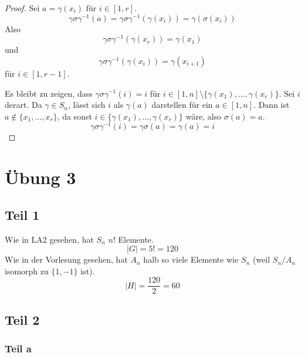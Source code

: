 \documentclass[10pt,a4paper]{article}
\begin{document}
\begin{proof}
  Sei $a = \gamma(x_{i})$ für $i \in [1, r]$.
  \begin{equation}
    \gamma\sigma\gamma^{-1}(a) = \gamma\sigma\gamma^{-1}(\gamma(x_{i})) = \gamma(\sigma(x_{i}))
  \end{equation}
  Also
  \begin{equation}
    \gamma\sigma\gamma^{-1}(\gamma(x_{r})) = \gamma(x_{1})
  \end{equation}
  und
  \begin{equation}
    \gamma\sigma\gamma^{-1}(\gamma(x_{i})) = \gamma(x_{i + 1})
  \end{equation}
  für $i \in [1, r - 1]$.

  Es bleibt zu zeigen, dass $\gamma\sigma\gamma^{-1}(i) = i$ für $i \in [1, n] \setminus \{\gamma(x_{1}), \dots, \gamma(x_{r})\}$.
  Sei $i$ derart.
  Da $\gamma \in S_{n}$, lässt sich $i$ als $\gamma(a)$ darstellen für ein $a \in [1, n]$.
  Dann ist $a \not\in \{ x_{1}, \dots, x_{r} \}$, da sonst $i \in \{ \gamma(x_{1}), \dots, \gamma(x_{r}) \}$ wäre, also $\sigma(a) = a$.
  \begin{equation}
    \gamma\sigma\gamma^{-1}(i) = \gamma\sigma(a) = \gamma(a) = i
  \end{equation}
\end{proof}

\section{Übung 3}

\subsection{Teil 1}

Wie in LA2 gesehen, hat $S_{n}$ $n!$ Elemente.
\begin{equation}
  |G| = 5! = 120
\end{equation}
Wie in der Vorlesung gesehen, hat $A_{n}$ halb so viele Elemente wie $S_{n}$ (weil $S_{n} / A_{n}$ isomorph zu $\{ 1, -1 \}$ ist).
\begin{equation}
  |H| = \frac{120}{2} = 60
\end{equation}

\subsection{Teil 2}

\subsubsection{Teil a}
\end{document}
